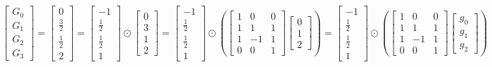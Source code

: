 \documentclass{article}%
\begin{document}
\[%
\left[\begin{matrix}G_{0}\\G_{1}\\G_{2}\\G_{3}\end{matrix}\right] = \left[\begin{matrix}0\\\frac{3}{2}\\\frac{1}{2}\\2\end{matrix}\right] = \left[\begin{matrix}-1\\\frac{1}{2}\\\frac{1}{2}\\1\end{matrix}\right] \odot \left[\begin{matrix}0\\3\\1\\2\end{matrix}\right] = \left[\begin{matrix}-1\\\frac{1}{2}\\\frac{1}{2}\\1\end{matrix}\right] \odot \left( \left[\begin{matrix}1 & 0 & 0\\1 & 1 & 1\\1 & -1 & 1\\0 & 0 & 1\end{matrix}\right] \left[\begin{matrix}0\\1\\2\end{matrix}\right] \right) = \left[\begin{matrix}-1\\\frac{1}{2}\\\frac{1}{2}\\1\end{matrix}\right] \odot \left( \left[\begin{matrix}1 & 0 & 0\\1 & 1 & 1\\1 & -1 & 1\\0 & 0 & 1\end{matrix}\right] \left[\begin{matrix}g_{0}\\g_{1}\\g_{2}\end{matrix}\right] \right)%
\]%
\end{document}

